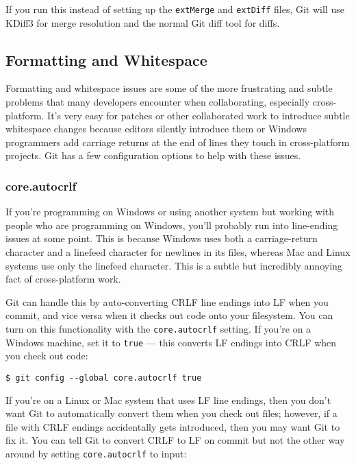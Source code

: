 \documentclass[a4paper]{book}
\begin{document}
If you run this instead of setting up the \texttt{extMerge} and \texttt{extDiff} files, Git will use KDiff3 for merge resolution and the normal Git diff tool for diffs.

\subsection{Formatting and Whitespace}

Formatting and whitespace issues are some of the more frustrating and subtle problems that many developers encounter when collaborating, especially cross-platform. It's very easy for patches or other collaborated work to introduce subtle whitespace changes because editors silently introduce them or Windows programmers add carriage returns at the end of lines they touch in cross-platform projects. Git has a few configuration options to help with these issues.

\subsubsection{core.autocrlf}

If you're programming on Windows or using another system but working with people who are programming on Windows, you'll probably run into line-ending issues at some point. This is because Windows uses both a carriage-return character and a linefeed character for newlines in its files, whereas Mac and Linux systems use only the linefeed character. This is a subtle but incredibly annoying fact of cross-platform work.

Git can handle this by auto-converting CRLF line endings into LF when you commit, and vice versa when it checks out code onto your filesystem. You can turn on this functionality with the \texttt{core.autocrlf} setting. If you're on a Windows machine, set it to \texttt{true} --- this converts LF endings into CRLF when you check out code:

\begin{shaded}\begin{verbatim}
$ git config --global core.autocrlf true
\end{verbatim}\end{shaded}

If you're on a Linux or Mac system that uses LF line endings, then you don't want Git to automatically convert them when you check out files; however, if a file with CRLF endings accidentally gets introduced, then you may want Git to fix it. You can tell Git to convert CRLF to LF on commit but not the other way around by setting \texttt{core.autocrlf} to input:
\end{document}
